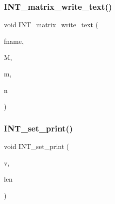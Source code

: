 \mbox{\label{util_8_c_a3875416451748de5d1f4bf92f2716e53}} 
\subsubsection{\texorpdfstring{I\+N\+T\+\_\+matrix\+\_\+write\+\_\+text()}{INT\_matrix\_write\_text()}}
{\footnotesize\ttfamily void I\+N\+T\+\_\+matrix\+\_\+write\+\_\+text (\begin{DoxyParamCaption}\item[{const \mbox{\hyperlink{galois_8h_ab6cc7b4aeb6ea31aba2b3fbfc83ff5e6}{B\+Y\+TE}} $\ast$}]{fname,  }\item[{\mbox{\hyperlink{galois_8h_a09fddde158a3a20bd2dcadb609de11dc}{I\+NT}} $\ast$}]{M,  }\item[{\mbox{\hyperlink{galois_8h_a09fddde158a3a20bd2dcadb609de11dc}{I\+NT}}}]{m,  }\item[{\mbox{\hyperlink{galois_8h_a09fddde158a3a20bd2dcadb609de11dc}{I\+NT}}}]{n }\end{DoxyParamCaption})}

\mbox{\label{util_8_c_a97614645ec11df30e0e896367f91ffd9}} 
\subsubsection{\texorpdfstring{I\+N\+T\+\_\+set\+\_\+print()}{INT\_set\_print()}\hspace{0.1cm}{\footnotesize\ttfamily [1/2]}}
{\footnotesize\ttfamily void I\+N\+T\+\_\+set\+\_\+print (\begin{DoxyParamCaption}\item[{\mbox{\hyperlink{galois_8h_a09fddde158a3a20bd2dcadb609de11dc}{I\+NT}} $\ast$}]{v,  }\item[{\mbox{\hyperlink{galois_8h_a09fddde158a3a20bd2dcadb609de11dc}{I\+NT}}}]{len }\end{DoxyParamCaption})}

\mbox{\label{util_8_c_a424a19268f9498b8cc0c30fc9cf18b05}} 
